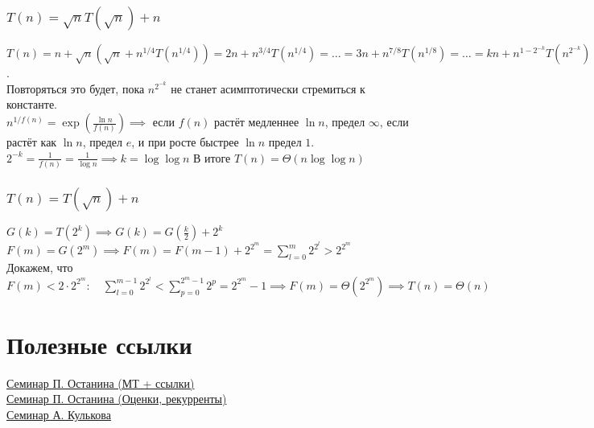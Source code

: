 \documentclass{article}
\begin{document}
\subsubsection{$T(n) = \sqrt nT(\sqrt n) + n$}
$T(n) = n + \sqrt n (\sqrt n + n^{1/4}T(n^{1/4})) = 2n + n^{3/4}T(n^{1/4}) = \dotsc = 3n + n^{7/8}T(n^{1/8}) = \dotsc = kn + n^{1-2^{-k}}T(n^{2^{-k}})$.\\
Повторяться это будет, пока $n^{2^{-k}}$ не станет асимптотически стремиться к константе. \\
$n^{1/f(n)} = \exp\left(\frac{\ln n}{f(n)}\right) \implies $ если $f(n)$ растёт медленнее $\ln n$, предел $\infty$, если растёт как $\ln n$, предел $e$, и при росте быстрее $\ln n$ предел $1$. \\
$2^{-k} = \frac{1}{f(n)} = \frac{1}{\log n} \implies k = \log \log n$
В итоге $\boxed{T(n) = \Theta(n\log \log n)}$

\subsubsection{$T(n) = T(\sqrt n) + n$}
$G(k) = T(2^k) \implies G(k) = G(\frac{k}{2}) + 2^k$ \\
$F(m) = G(2^m) \implies F(m) = F(m-1) + 2^{2^m} = \sum\limits_{l=0}^{m} 2^{2^l} > 2^{2^m}$ \\
Докажем, что $F(m) < 2\cdot2^{2^m}: \quad \sum\limits_{l=0}^{m-1} 2^{2^l} < \sum\limits_{p=0}^{2^{m} - 1} 2^{p} = 2^{2^m} - 1 \implies F(m) = \Theta(2^{2^m}) \implies \boxed{T(n) = \Theta(n)}$

\section{Полезные ссылки}
\href{https://vk.com/algo675?w=wall-139602945_5}{Семинар П. Останина (МТ + ссылки)}\\
\href{https://vk.com/algo675?w=wall-139602945_167}{Семинар П. Останина (Оценки, рекурренты)}\\
\href{https://vk.com/doc14914624_459299493?hash=21e416fbd55f65e820&dl=3ca48d6d91411a75c2}{Семинар А. Кулькова}\\
\end{document}
